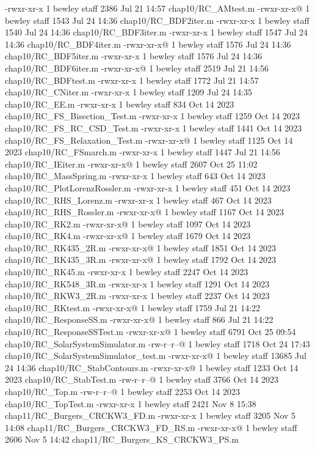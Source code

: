 -rwxr-xr-x  1 bewley  staff   2386 Jul 21 14:57 chap10/RC_AMtest.m
-rwxr-xr-x@ 1 bewley  staff   1543 Jul 24 14:36 chap10/RC_BDF2iter.m
-rwxr-xr-x  1 bewley  staff   1540 Jul 24 14:36 chap10/RC_BDF3iter.m
-rwxr-xr-x  1 bewley  staff   1547 Jul 24 14:36 chap10/RC_BDF4iter.m
-rwxr-xr-x@ 1 bewley  staff   1576 Jul 24 14:36 chap10/RC_BDF5iter.m
-rwxr-xr-x  1 bewley  staff   1576 Jul 24 14:36 chap10/RC_BDF6iter.m
-rwxr-xr-x@ 1 bewley  staff   2519 Jul 21 14:56 chap10/RC_BDFtest.m
-rwxr-xr-x  1 bewley  staff   1772 Jul 21 14:57 chap10/RC_CNiter.m
-rwxr-xr-x  1 bewley  staff   1209 Jul 24 14:35 chap10/RC_EE.m
-rwxr-xr-x  1 bewley  staff    834 Oct 14  2023 chap10/RC_FS_Bisection_Test.m
-rwxr-xr-x  1 bewley  staff   1259 Oct 14  2023 chap10/RC_FS_RC_CSD_Test.m
-rwxr-xr-x  1 bewley  staff   1441 Oct 14  2023 chap10/RC_FS_Relaxation_Test.m
-rwxr-xr-x@ 1 bewley  staff   1125 Oct 14  2023 chap10/RC_FSmarch.m
-rwxr-xr-x  1 bewley  staff   1447 Jul 21 14:56 chap10/RC_IEiter.m
-rwxr-xr-x@ 1 bewley  staff   2607 Oct 25 11:02 chap10/RC_MassSpring.m
-rwxr-xr-x  1 bewley  staff    643 Oct 14  2023 chap10/RC_PlotLorenzRossler.m
-rwxr-xr-x  1 bewley  staff    451 Oct 14  2023 chap10/RC_RHS_Lorenz.m
-rwxr-xr-x  1 bewley  staff    467 Oct 14  2023 chap10/RC_RHS_Rossler.m
-rwxr-xr-x@ 1 bewley  staff   1167 Oct 14  2023 chap10/RC_RK2.m
-rwxr-xr-x@ 1 bewley  staff   1097 Oct 14  2023 chap10/RC_RK4.m
-rwxr-xr-x@ 1 bewley  staff   1679 Oct 14  2023 chap10/RC_RK435_2R.m
-rwxr-xr-x@ 1 bewley  staff   1851 Oct 14  2023 chap10/RC_RK435_3R.m
-rwxr-xr-x@ 1 bewley  staff   1792 Oct 14  2023 chap10/RC_RK45.m
-rwxr-xr-x  1 bewley  staff   2247 Oct 14  2023 chap10/RC_RK548_3R.m
-rwxr-xr-x  1 bewley  staff   1291 Oct 14  2023 chap10/RC_RKW3_2R.m
-rwxr-xr-x  1 bewley  staff   2237 Oct 14  2023 chap10/RC_RKtest.m
-rwxr-xr-x@ 1 bewley  staff   1759 Jul 21 14:22 chap10/RC_ResponseSS.m
-rwxr-xr-x@ 1 bewley  staff    866 Jul 21 14:22 chap10/RC_ResponseSSTest.m
-rwxr-xr-x@ 1 bewley  staff   6791 Oct 25 09:54 chap10/RC_SolarSystemSimulator.m
-rw-r--r--@ 1 bewley  staff   1718 Oct 24 17:43 chap10/RC_SolarSystemSimulator_test.m
-rwxr-xr-x@ 1 bewley  staff  13685 Jul 24 14:36 chap10/RC_StabContours.m
-rwxr-xr-x@ 1 bewley  staff   1233 Oct 14  2023 chap10/RC_StabTest.m
-rw-r--r--@ 1 bewley  staff   3766 Oct 14  2023 chap10/RC_Top.m
-rw-r--r--@ 1 bewley  staff   2253 Oct 14  2023 chap10/RC_TopTest.m
-rwxr-xr-x  1 bewley  staff   2421 Nov  8 15:38 chap11/RC_Burgers_CRCKW3_FD.m
-rwxr-xr-x  1 bewley  staff   3205 Nov  5 14:08 chap11/RC_Burgers_CRCKW3_FD_RS.m
-rwxr-xr-x@ 1 bewley  staff   2606 Nov  5 14:42 chap11/RC_Burgers_KS_CRCKW3_PS.m
